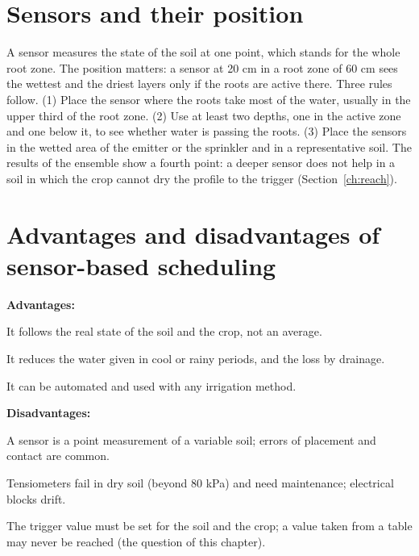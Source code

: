 \section{Sensors and their position}
A sensor measures the state of the soil at one point, which stands for the whole root zone. The position matters: a sensor at 20 cm in a root zone of 60 cm sees the wettest and the driest layers only if the roots are active there. Three rules follow. (1) Place the sensor where the roots take most of the water, usually in the upper third of the root zone. (2) Use at least two depths, one in the active zone and one below it, to see whether water is passing the roots. (3) Place the sensors in the wetted area of the emitter or the sprinkler and in a representative soil. The results of the ensemble show a fourth point: a deeper sensor does not help in a soil in which the crop cannot dry the profile to the trigger (Section~\ref{ch:reach}).

\section{Advantages and disadvantages of sensor-based scheduling}
\textbf{Advantages:}
\begin{exlist}
\item It follows the real state of the soil and the crop, not an average.
\item It reduces the water given in cool or rainy periods, and the loss by drainage.
\item It can be automated and used with any irrigation method.
\end{exlist}
\noindent\textbf{Disadvantages:}
\begin{exlist}
\item A sensor is a point measurement of a variable soil; errors of placement and contact are common.
\item Tensiometers fail in dry soil (beyond 80 kPa) and need maintenance; electrical blocks drift.
\item The trigger value must be set for the soil and the crop; a value taken from a table may never be reached (the question of this chapter).
\end{exlist}

